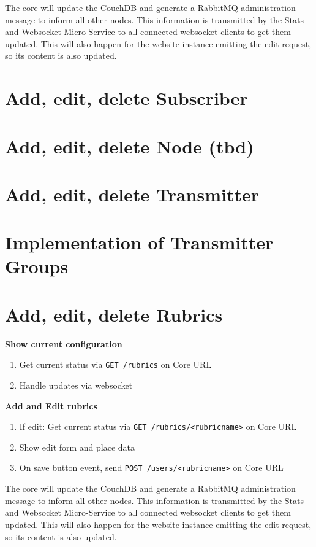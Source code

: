 The core will update the CouchDB and generate a RabbitMQ administration message
to inform all other nodes. This information is transmitted by the Stats and
Websocket Micro-Service to all connected websocket clients to get them updated.
This will also happen for the website instance emitting the edit request, so its
content is also updated.

\section{Add, edit, delete Subscriber}

\section{Add, edit, delete Node (tbd)}

\section{Add, edit, delete Transmitter}

\section{Implementation of Transmitter Groups}

\section{Add, edit, delete Rubrics}

\textbf{Show current configuration}
\begin{enumerate}
  \item Get current status via \texttt{GET /rubrics} on Core URL
  \item Handle updates via websocket
\end{enumerate}

\textbf{Add and Edit rubrics}
\begin{enumerate}
\item If edit: Get current status via \texttt{GET /rubrics/<rubricname>} on Core URL
\item Show edit form and place data
\item On save button event, send \texttt{POST /users/<rubricname>} on Core URL
\end{enumerate}

The core will update the CouchDB and generate a RabbitMQ administration message
to inform all other nodes. This information is transmitted by the Stats and
Websocket Micro-Service to all connected websocket clients to get them updated.
This will also happen for the website instance emitting the edit request, so its
content is also updated.

